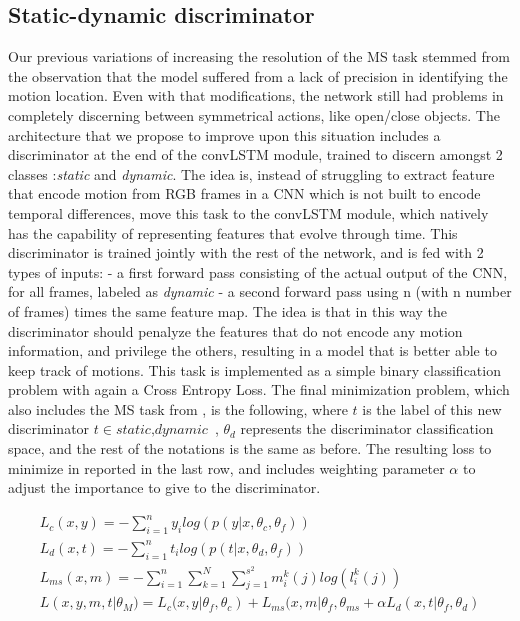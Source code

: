 \documentclass[10pt,twocolumn,hidelinks,letterpaper]{article}
\begin{document}
\subsection{Static-dynamic discriminator}

Our previous variations of increasing the resolution of the MS task stemmed from the observation that
the model suffered from a lack of precision in identifying the motion location. Even with that modifications, the network still had problems in completely discerning between symmetrical actions, like open/close objects. The architecture that we propose to improve upon this situation includes a discriminator at the end of the convLSTM module, trained to discern amongst 2 classes :\textit{static} and \textit{dynamic}. The idea is, instead of struggling to extract feature that encode motion from RGB frames
in a CNN which is not built to encode temporal differences, move this task to the convLSTM module, 
which natively has the capability of representing features that evolve through time. This discriminator is trained jointly with the rest of the network, and is fed with 2 types of inputs:
- a first forward pass consisting of the actual output of the CNN, for all frames, labeled as \textit{dynamic}
- a second forward pass using n (with n number of frames) times the same feature map.
The idea is that in this way the discriminator should penalyze the features that do not encode 
any motion information, and privilege the others, resulting in a model that is better able to
keep track of motions.
This task is implemented as a simple binary classification problem with again a Cross Entropy Loss.
The final minimization problem, which also includes the MS task from \cite{sparnet}, is the following,
where $t$ is the label of this new discriminator $t \in {\textit{static}, \textit{dynamic}}$ ,
$\theta_d$ represents the discriminator classification space, and the rest of the notations is the same as 
before. The resulting loss to minimize in reported in the last row, and includes weighting parameter $\alpha$ to adjust the importance to give to the discriminator.

\begin{align*}
L_c(x,y) = - \sum_{i=1}^{n} y_i log(p(y|x, \theta_c, \theta_f))\\
L_d(x,t) = - \sum_{i=1}^{n} t_i log(p(t|x, \theta_d, \theta_f))\\
L_{ms}(x,m) = - \sum_{i=1}^{n} \sum_{k=1}^{N} \sum_{j=1}^{s^2} m_i^k(j)log(l_i^k(j)) \\
L(x,y,m,t| \theta_M) = L_c(x,y|\theta_f, \theta_c) + L_{ms}(x,m| \theta_f, \theta_{ms} + \alpha L_d(x,t| \theta_f, \theta_{d}  ) 
\end{align*}
\end{document}
